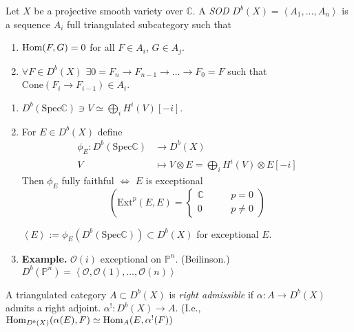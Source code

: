 \begin{definition}
\label{definition-SOD}
Let $X$ be a projective smooth variety over $\mathbb{C}$. 
A {\it SOD} $D^b(X)=\left<A_1,\ldots,A_n\right>$ is a sequence $A_i$ full
triangulated subcategory such that
\begin{enumerate}
\item $\mathop{\mathrm{Hom}}\nolimits(F,G)=0$ for all $F \in A_i$, $G \in A_j$.
\item $\forall F \in D^b(X)$ $\exists 0=F_n\to F_{n-1}\to\ldots\to F_0=F$ 
such that
$\text{Cone}(F_i \to F_{i-1})\in A_i$.
\end{enumerate}
\end{definition}

\begin{exercise}
\label{exercise-}
\begin{enumerate}
\item $D^b(\text{Spec}\mathbb{C})\ni V \simeq \bigoplus_{i}H^{i}(V)[-i]$.
\item For $E \in D^b(X)$ define
\begin{align*}
\phi_E: D^b(\text{Spec}\mathbb{C}) &\longrightarrow D^b(X) \\
V &\longmapsto V\otimes E=\bigoplus_{i}H^i(V)\otimes E[-i]
\end{align*}
Then $\phi_E$ fully faithful $\iff$ $E$ is exceptional
$$
\left(\text{Ext}^p(E,E)=
\begin{cases}
\mathbb{C}\qquad &p=0 \\
0\qquad &p\neq 0
\end{cases}\right)
$$
\begin{definition}
\label{definition-}
$\left<E\right>:=\phi_E(D^b(\text{Spec}\mathbb{C}))\subset D^b(X)$ for
exceptional $E$.

\end{definition}
\item {\bf Example.} $\mathcal{O}(i)$ exceptional on $\mathbb{P}^n$.
(Beilinson.) $D^b(\mathbb{P}^n)
=\left<\mathcal{O},\mathcal{O}(1),\ldots,\mathcal{O}(n)\right>$
\end{enumerate}
\end{exercise}

\begin{definition}
\label{definition-right-admissible}
A triangulated category $A \subset D^b(X)$ is {\it right admissible} if
$\alpha:A\to D^b(X)$ admits a right adjoint. $\alpha^!:D^b(X)\to A$. (I.e.,
$\mathop{\mathrm{Hom}}\nolimits_{D^b(X)}(\alpha(E),F)\simeq \mathop{\mathrm{Hom}}\nolimits_A(E,\alpha^!(F))$
\end{definition}

